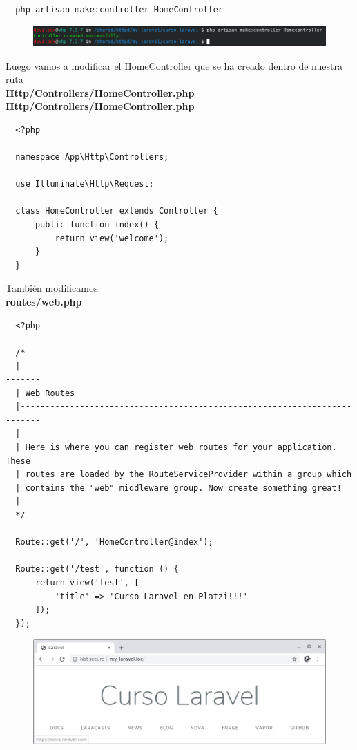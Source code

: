 \documentclass{article}
\begin{document}
\begin{verbatim}
  php artisan make:controller HomeController
\end{verbatim}

\begin{figure}[h!]
  \centering
  \includegraphics[scale=0.65]{./Pictures/011_artisar_make_controller.png}
\end{figure}

Luego vamos a modificar el HomeController que se ha creado dentro de nuestra ruta \\
\textbf{Http/Controllers/HomeController.php}\\

\textbf{Http/Controllers/HomeController.php}
\begin{verbatim}
  <?php

  namespace App\Http\Controllers;

  use Illuminate\Http\Request;

  class HomeController extends Controller {
      public function index() {
          return view('welcome');
      }
  }
\end{verbatim}

\newpage

También modificamos:\\

\textbf{routes/web.php}
\begin{verbatim}
  <?php

  /*
  |--------------------------------------------------------------------------
  | Web Routes
  |--------------------------------------------------------------------------
  |
  | Here is where you can register web routes for your application. These
  | routes are loaded by the RouteServiceProvider within a group which
  | contains the "web" middleware group. Now create something great!
  |
  */

  Route::get('/', 'HomeController@index');

  Route::get('/test', function () {
      return view('test', [
          'title' => 'Curso Laravel en Platzi!!!'
      ]);
  });
\end{verbatim}

\begin{figure}[h!]
  \centering
  \includegraphics[scale=0.5]{./Pictures/012_homeController.png}
\end{figure}
\end{document}
